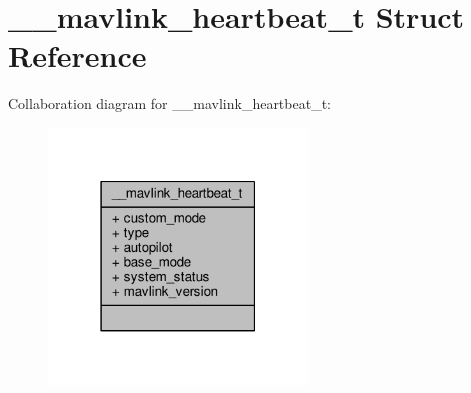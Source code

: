 \hypertarget{struct____mavlink__heartbeat__t}{\section{\+\_\+\+\_\+mavlink\+\_\+heartbeat\+\_\+t Struct Reference}
\label{struct____mavlink__heartbeat__t}
}


Collaboration diagram for \+\_\+\+\_\+mavlink\+\_\+heartbeat\+\_\+t\+:
\nopagebreak
\begin{figure}[H]
\begin{center}
\leavevmode
\includegraphics[width=195pt]{struct____mavlink__heartbeat__t__coll__graph}
\end{center}
\end{figure}
